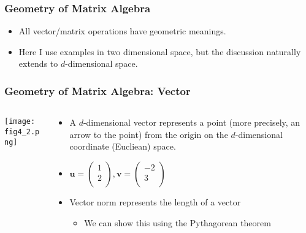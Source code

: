 \documentclass[pdflatex, 12pt]{beamer}
\begin{document}
\begin{frame}
\frametitle{Geometry of Matrix Algebra}
\begin{itemize}
\item All vector/matrix operations have geometric meanings.
\vspace{0.4cm}
\item Here I use examples in two dimensional space, but the discussion naturally extends to $d$-dimensional space. 
\end{itemize}
\end{frame}

\begin{frame}
\frametitle{Geometry of Matrix Algebra: Vector}
\begin{columns}
\begin{column}{0.5\textwidth}
\centering
\texttt{[image: fig4\_2.png]}
\end{column}
\begin{column}{0.5\textwidth}
\begin{itemize}
\item A $d$-dimensional vector represents a point (more precisely, an arrow to the point) from the origin on the $d$-dimensional coordinate (Eucliean) space.
\vspace{0.4cm}
\item $\bm{u} = \begin{pmatrix}
1 \\
2 \\
\end{pmatrix}, \bm{v} = \begin{pmatrix}
-2 \\
3 \\
\end{pmatrix}$
\vspace{0.4cm}
\item Vector norm represents the length of a vector
 \begin{itemize}
 \item We can show this using the Pythagorean theorem
 \end{itemize}
\end{itemize}
\end{column}
\end{columns}
\end{frame}
\end{document}
